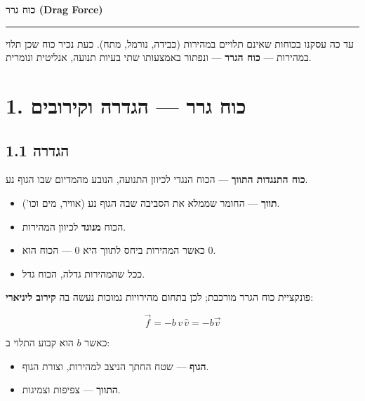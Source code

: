 \documentclass[12pt, a4paper]{article}
\newcommand{\hvec}[1]{\overrightarrow{#1}}
\begin{document}

\begin{center}
  {\LARGE\bfseries כוח גרר \textenglish{(Drag Force)}}\\[6pt]
  \rule{\linewidth}{0.8pt}
\end{center}
\vspace{0.5cm}

עד כה עסקנו בכוחות שאינם תלויים במהירות (כבידה, נורמל, מתח). כעת נכיר כוח שכן תלוי במהירות --- \textbf{כוח הגרר} --- ונפתור באמצעותו שתי בעיות תנועה, אנליטית ונומרית.

\section*{1. כוח גרר --- הגדרה וקירובים}

\subsection*{1.1 הגדרה}

\begin{tcolorbox}[defbox, title={כוח גרר (\textenglish{Drag Force})}]
\textbf{כוח התנגדות התווך} --- הכוח הנגדי לכיוון התנועה, הנובע מהמדיום שבו הגוף נע.
\begin{itemize}
  \item \textbf{תווך} --- החומר שממלא את הסביבה שבה הגוף נע (אוויר, מים וכו').
  \item הכוח \textbf{מנוגד} לכיוון המהירות.
  \item כאשר המהירות ביחס לתווך היא \textenglish{$0$} --- הכוח הוא \textenglish{$0$}.
  \item ככל שהמהירות גדלה, הכוח גדל.
\end{itemize}
\end{tcolorbox}

פונקציית כוח הגרר מורכבת; לכן בתחום מהירויות נמוכות נעשה בה \textbf{קירוב ליניארי}:

\begin{tcolorbox}[resultbox, title={קירוב ליניארי}]
\[
  \hvec{f} = -b\,v\,\hat{v} = -b\hvec{v}
\]
\end{tcolorbox}

כאשר \textenglish{$b$} הוא קבוע התלוי ב:
\begin{itemize}
  \item \textbf{הגוף} --- שטח החתך הניצב למהירות, וצורת הגוף.
  \item \textbf{התווך} --- צפיפות וצמיגות.
\end{itemize}
\end{document}
